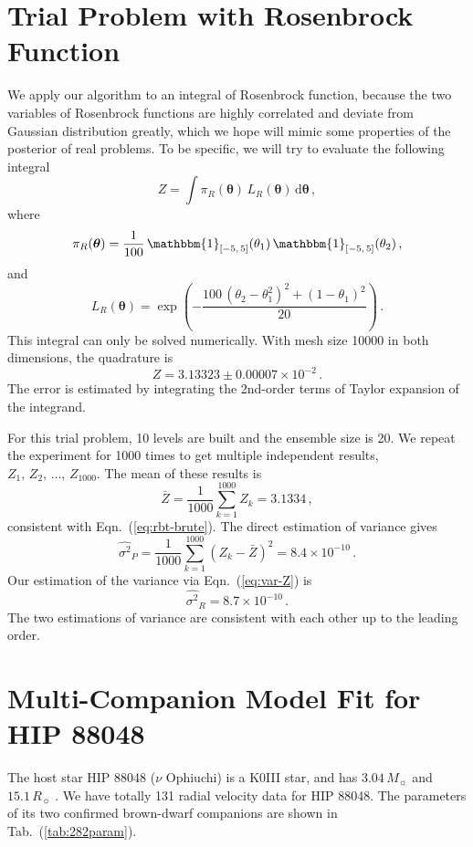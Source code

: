 \documentclass[letterpaper, preprint]{aastex}
\newcommand{\bth} {\boldsymbol \theta}
\newcommand{\md}{\mathrm{d}}
\begin{document}
\section{Trial Problem with Rosenbrock Function}
\label{sec:rosenbrock}
We apply our algorithm to an integral of Rosenbrock function, because the two variables of Rosenbrock functions are highly correlated and deviate from Gaussian distribution greatly, which we hope will mimic some properties of the posterior of real problems. To be specific, we will try to evaluate the following integral
\begin{equation*}
Z=\int \pi_R(\bth)\,L_R(\bth)\,\md\bth\, ,
\end{equation*}
where
\begin{equation}
\pi_R(\bth) =\frac{1}{100}\, \mathbbm{1}_{[-5,\,5]}(\theta_1)\, \mathbbm{1}_{[-5,\,5]}(\theta_2)\, ,
\end{equation}
and
\begin{equation}
L_R(\bth) = \exp \left(  - \frac{100\,(\theta_2-\theta_1^2)^2 + (1-\theta_1)^2}{20} \right)\, .
\end{equation}
This integral can only be solved numerically. With mesh size 10000 in both dimensions, the quadrature is
\begin{equation}
Z = 3.13323 \pm 0.00007 \times 10^{-2}\, .
\label{eq:rbt-brute}
\end{equation}
The error is estimated by integrating the 2nd-order terms of Taylor expansion of the integrand.

For this trial problem, 10 levels are built and the ensemble size is 20. We repeat the experiment for 1000 times to get multiple independent results, $Z_1,\,Z_2,\,\ldots,\,Z_{1000}$. The mean of these results is
\begin{equation}
\bar{Z} = \frac{1}{1000}\sum_{k=1}^{1000}Z_k = 3.1334\, ,
\end{equation}
consistent with Eqn.~(\ref{eq:rbt-brute}). The direct estimation of variance gives
\begin{equation}
\widehat{\sigma^2}_P = \frac{1}{1000}\sum_{k=1}^{1000}(Z_k-\bar{Z})^2 = 8.4\times 10^{-10}\, .
\end{equation}
Our estimation of the variance via Eqn.~(\ref{eq:var-Z}) is
\begin{equation}
\widehat{\sigma^2}_R = 8.7\times 10^{-10}\, .
\end{equation}
The two estimations of variance are consistent with each other up to the leading order.

\section{Multi-Companion Model Fit for HIP 88048}
\label{sec:tszyj}
The host star HIP 88048 ($\nu$ Ophiuchi) is a K0III star, and has $3.04\,M_\sun$ and $15.1\,R_\sun$ \citep{sato12a}. We have totally 131 radial velocity data for HIP 88048. The parameters of its two confirmed brown-dwarf companions are shown in Tab.~(\ref{tab:282param}).
\end{document}
